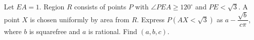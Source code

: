 Let $EA=1$. Region $R$ consists of points $P$ with $\angle PEA\ge 120^\circ$ and $PE<\sqrt 3$. A point $X$ is chosen uniformly by area from $R$. Express $P(AX<\sqrt 3)$ as $a-\dfrac{\sqrt b}{c\pi}$, where $b$ is squarefree and $a$ is rational. Find $(a,b,c)$.
